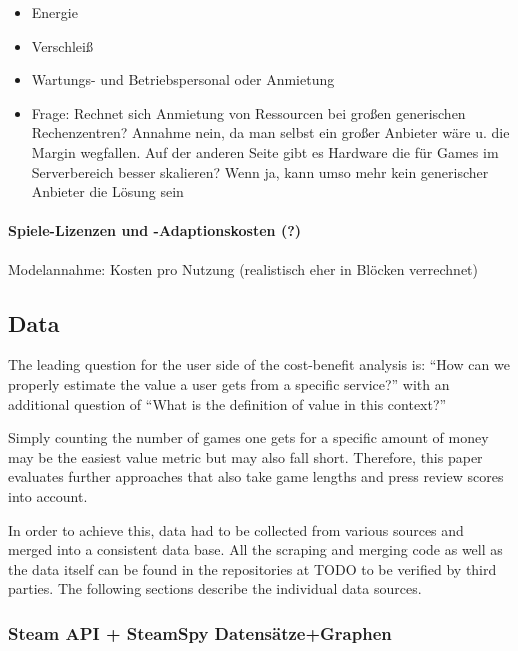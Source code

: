 \begin{itemize}
	\item Energie
	\item Verschleiß
	\item Wartungs- und Betriebspersonal oder Anmietung
	\item Frage: Rechnet sich Anmietung von Ressourcen bei großen generischen Rechenzentren? Annahme nein, da man selbst ein großer Anbieter wäre u. die Margin wegfallen. Auf der anderen Seite gibt es Hardware die für Games im Serverbereich besser skalieren? Wenn ja, kann umso mehr kein generischer Anbieter die Lösung sein
\end{itemize}

\paragraph{Spiele-Lizenzen und -Adaptionskosten (?)}
Modelannahme: Kosten pro Nutzung (realistisch eher in Blöcken verrechnet)





\subsection{Data}

The leading question for the user side of the cost-benefit analysis is: ``How can we properly estimate the value a user gets from a specific service?'' with an additional question of ``What is the definition of value in this context?''

Simply counting the number of games one gets for a specific amount of money may be the easiest value metric but may also fall short. Therefore, this paper evaluates further approaches that also take game lengths and press review scores into account.

In order to achieve this, data had to be collected from various sources and merged into a consistent data base. All the scraping and merging code as well as the data itself can be found in the repositories at TODO to be verified by third parties. The following sections describe the individual data sources.

\subsubsection{Steam API + SteamSpy Datensätze+Graphen}

